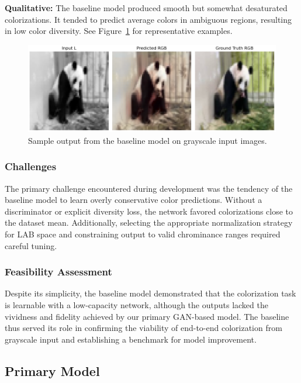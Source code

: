 \documentclass{article} %
\begin{document}
\textbf{Qualitative:} The baseline model produced smooth but somewhat desaturated colorizations. It tended to predict average colors in ambiguous regions, resulting in low color 
diversity. See Figure~\ref{fig:baseline_outputs} for representative examples.

\begin{figure}[htbp]
    \centering
    \includegraphics[width=\textwidth]{Figs/baseline_output.png}
    \caption{Sample output from the baseline model on grayscale input images.}
    \label{fig:baseline_outputs}
\end{figure}

\subsubsection{Challenges}

The primary challenge encountered during development was the tendency of the baseline model to learn overly conservative color predictions. Without a discriminator or explicit 
diversity loss, the network favored colorizations close to the dataset mean. Additionally, selecting the appropriate normalization strategy for LAB space and constraining output to 
valid chrominance ranges required careful tuning.

\subsubsection{Feasibility Assessment}

Despite its simplicity, the baseline model demonstrated that the colorization task is learnable with a low-capacity network, although the outputs lacked the vividness and fidelity 
achieved by our primary GAN-based model. The baseline thus served its role in confirming the viability of end-to-end colorization from grayscale input and establishing a benchmark 
for model improvement.

\subsection{Primary Model}
\end{document}
